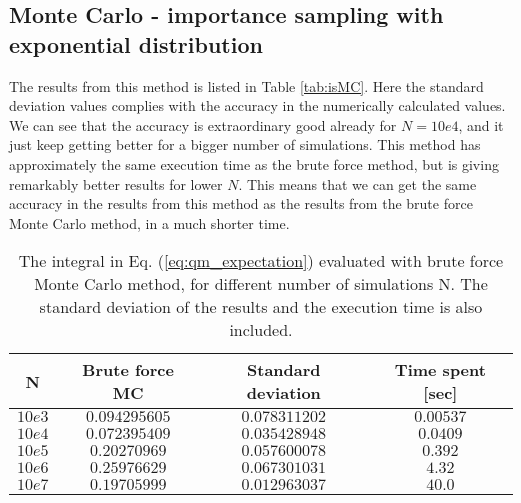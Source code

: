 \documentclass[12pt]{article}
\begin{document}
\begin{flushleft}
\subsection{Monte Carlo - importance sampling with exponential distribution}
The results from this method is listed in Table \ref{tab:isMC}. Here the standard deviation values complies with the accuracy in the numerically calculated values. We can see that the accuracy is extraordinary good already for $N=10e4$, and it just keep getting better for a bigger number of simulations. This method has approximately the same execution time as the brute force method, but is giving remarkably better results for lower $N$. This means that we can get the same accuracy in the results from this method as the results from the brute force Monte Carlo method, in a much shorter time.  
\vspace{5mm}
\begin{table}[!h]
\begin{center}
\begin{tabular}{| c | c | c | c |}
	\hline
	\textbf{N}  & \textbf{Brute force MC} &  \textbf{Standard deviation} & \textbf{Time spent [sec]}\\
	\hline		
	$10e3$ & $0.094295605$ & $0.078311202$ & $0.00537$ \\
    $10e4$ & $0.072395409$ & $0.035428948$ & $0.0409$\\
    $10e5$ & $0.20270969$ & $0.057600078$ & $0.392$\\
    $10e6$ & $0.25976629$ & $0.067301031$ & $4.32$\\
    $10e7$ & $0.19705999$ & $0.012963037$ & $40.0$\\
  \hline
\end{tabular}
\end{center}
\caption{\label{tab:bfMC}The integral in Eq. (\ref{eq:qm_expectation}) evaluated with brute force Monte Carlo method, for different number of simulations N. The standard deviation of the results and the execution time is also included.}
\end{table}
\vspace{5mm}


\end{flushleft}
\end{document}
